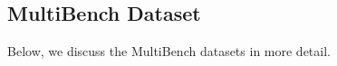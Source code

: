 








\subsection{MultiBench Dataset}\label{app:multibench}
Below, we discuss the MultiBench datasets in more detail.

